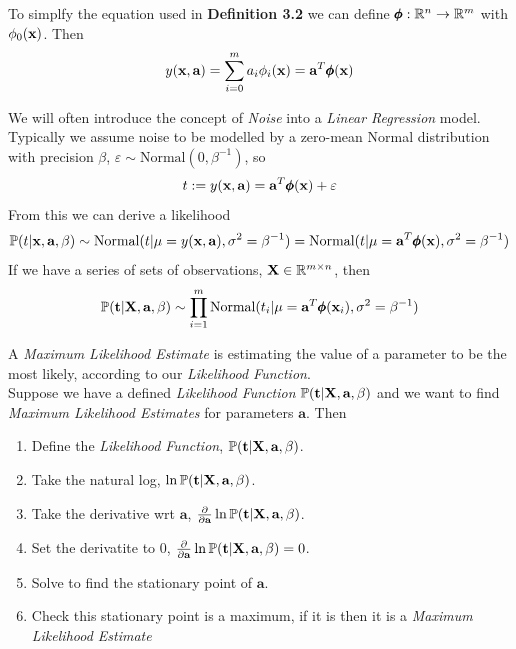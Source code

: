 \documentclass[11pt,a4paper]{article}
\begin{document}
To simplfy the equation used in \textbf{Definition 3.2} we can define $\pmb{\phi}:\mathbb{R}^n\to\mathbb{R}^m$ with $\phi_0(\textbf{x})$. Then
$$y(\textbf{x},\textbf{a})=\sum_{i=0}^ma_i\phi_i(\textbf{x})=\textbf{a}^T\pmb{\phi}(\textbf{x})$$

We will often introduce the concept of \textit{Noise} into a \textit{Linear Regression} model. Typically we assume noise to be modelled by a zero-mean Normal distribution with precision $\beta$, $\varepsilon\sim\text{Normal}(0,\beta^{-1})$, so
$$t:=y(\textbf{x},\textbf{a})=\textbf{a}^T\pmb{\phi}(\textbf{x})+\varepsilon$$
From this we can derive a likelihood
$$\mathbb{P}(t|\textbf{x},\textbf{a},\beta)\sim\text{Normal}(t|\mu=y(\textbf{x},\textbf{a}),\sigma^2=\beta^{-1})=\text{Normal}(t|\mu=\textbf{a}^T\pmb{\phi}(\textbf{x}),\sigma^2=\beta^{-1})$$
If we have a series of sets of observations, $\textbf{X}\in\mathbb{R}^{m\times n}$, then
$$\mathbb{P}(\textbf{t}|\textbf{X},\textbf{a},\beta)\sim\prod\limits_{i=1}^m\text{Normal}(t_i|\mu=\textbf{a}^T\pmb{\phi}(\textbf{x}_i),\sigma^2=\beta^{-1})$$

A \textit{Maximum Likelihood Estimate} is estimating the value of a parameter to be the most likely, according to our \textit{Likelihood Function}.\\

Suppose we have a defined \textit{Likelihood Function} $\mathbb{P}(\textbf{t}|\textbf{X},\textbf{a},\beta)$ and we want to find \textit{Maximum Likelihood Estimates} for parameters $\textbf{a}$. Then
\begin{enumerate}[label=\roman*)]
	\item Define the \textit{Likelihood Function}, $\mathbb{P}(\textbf{t}|\textbf{X},\textbf{a},\beta)$.
	\item Take the natural log, $\ln\mathbb{P}(\textbf{t}|\textbf{X},\textbf{a},\beta)$.
	\item Take the derivative wrt $\textbf{a}$, $\frac{\partial}{\partial\textbf{a}}\ln\mathbb{P}(\textbf{t}|\textbf{X},\textbf{a},\beta)$.
	\item Set the derivatite to $0$, $\frac{\partial}{\partial\textbf{a}}\ln\mathbb{P}(\textbf{t}|\textbf{X},\textbf{a},\beta)=0$.
	\item Solve to find the stationary point of $\textbf{a}$.
	\item Check this stationary point is a maximum, if it is then it is a \textit{Maximum Likelihood Estimate}
\end{enumerate}
\end{document}
